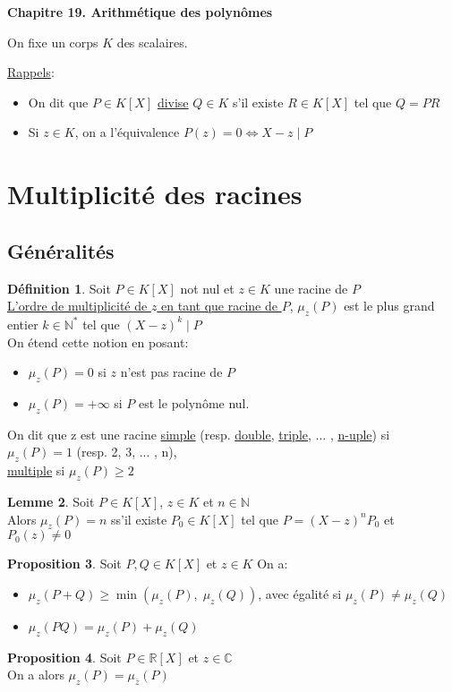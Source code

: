 \documentclass[10pt,a4paper]{article}
\theoremstyle{definition}
\newtheorem{proposition}{Proposition}[section]
\newtheorem{lemme}[proposition]{Lemme}
\newtheorem{definition}[proposition]{Définition}
\begin{document}
\renewcommand{\labelitemi}{$*$}
\renewcommand{\labelenumi}{(\roman{enumi})}
\begin{center}
{\Large \textbf{Chapitre 19. Arithmétique des polynômes}}
\end{center}
On fixe un corps $K$ des scalaires. \medskip

\uline{Rappels}:
\begin{itemize}
\item On dit que $P \in K[X]$ \uline{divise} $Q \in K$ s'il existe $R \in K[X]$ tel que $Q = PR$
\item Si $z \in K$, on a l'équivalence $P(z) = 0 \iff X - z \mid P$
\end{itemize}

\section{Multiplicité des racines}
\subsection{Généralités}
\begin{definition}
Soit $P \in K[X]$ not nul et $z \in K$ une racine de $P$ \\
\uline{L'ordre de multiplicité de $z$ en tant que racine de $P$}, $\mu_z(P)$ est le plus grand entier $k \in \mathbb{N}^*$ tel que $(X - z)^k \mid P$ \\
On étend cette notion en posant:
\begin{itemize}
\item $\mu_{z}(P) = 0$ si $z$ n'est pas racine de $P$
\item $\mu_{z}(P) = +\infty$ si $P$ est le polynôme nul.
\end{itemize}
On dit que z est une racine \uline{simple} (resp. \uline{double}, \uline{triple}, ... , \uline{n-uple}) si $\mu_{z}(P) = 1$ (resp. 2, 3, ... , n), \\
\uline{multiple} si $\mu_{z}(P) \geq 2$
\end{definition}
\begin{lemme}
Soit $P \in K[X]$, $z \in K$ et $n \in \mathbb{N}$ \\
Alors $\mu_{z}(P) = n$ ss'il existe $P_0 \in K[X]$ tel que $P = (X - z)^n P_0$ et $P_0(z) \neq 0$
\end{lemme}
\begin{proposition}
Soit $P, Q \in K[X]$ et $z \in K$ On a:
\begin{itemize}
\item $\mu_{z}(P + Q) \geq \min{(\mu_{z}(P), \; \mu_{z}(Q))}$, avec égalité si $\mu_{z}(P) \neq \mu_{z}(Q)$
\item $\mu_{z}(PQ) = \mu_{z}(P) + \mu_{z}(Q)$
\end{itemize}
\end{proposition}
\begin{proposition}
Soit $P \in \mathbb{R}[X]$ et $z \in \mathbb{C}$ \\
On a alors $\mu_{z}(P) = \mu_{\bar{z}}(P)$
\end{proposition}
\end{document}
